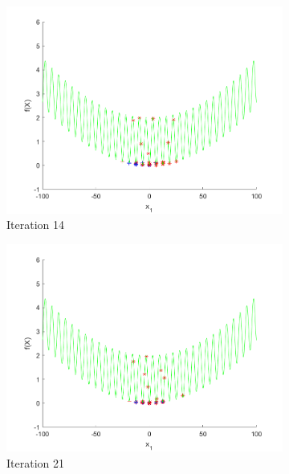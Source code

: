 \begin{figure}
\begin{subfigure}[b]{0.4\textwidth}
 \end{subfigure}
 \begin{subfigure}[b]{0.4\textwidth}
   \includegraphics[width=\textwidth]{img/smpl/grwnk1d/loa-iter-14}
   \caption{Iteration 14}
   \label{fig:s3-iter-2}
 \end{subfigure}
 \begin{subfigure}[b]{0.4\textwidth}
   \includegraphics[width=\textwidth]{img/smpl/grwnk1d/loa-iter-21}
   \caption{Iteration 21}
   \label{fig:s3-iter-3}
 \end{subfigure}
 \begin{subfigure}[b]{0.4\textwidth}

\end{subfigure}
\end{figure}
